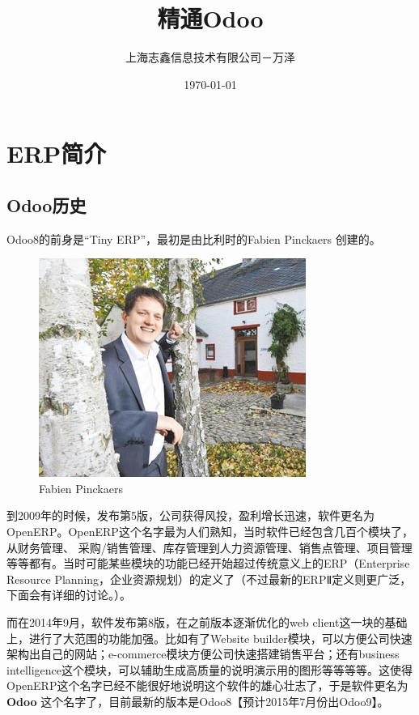 \documentclass[11pt,a4paper]{sphinxmanual}
\author{上海志鑫信息技术有限公司－万泽}
\date{\today}
\title{精通Odoo}
\begin{document}
\maketitle
\tableofcontents



\chapter{ERP简介}
\label{sec-1}
\section{Odoo历史}
\label{sec-1-1}
Odoo8的前身是“Tiny ERP”，最初是由比利时的Fabien Pinckaers 创建的。

\begin{figure}[H]
\centering
\includegraphics[keepaspectratio,max width=0.95\linewidth]{images/Fabien-Pinckaers.png}
\caption{Fabien Pinckaers}
\end{figure}

到2009年的时候，发布第5版，公司获得风投，盈利增长迅速，软件更名为OpenERP。OpenERP这个名字最为人们熟知，当时软件已经包含几百个模块了，从财务管理、
采购/销售管理、库存管理到人力资源管理、销售点管理、项目管理等等都有。当时可能某些模块的功能已经开始超过传统意义上的ERP（Enterprise Resource Planning，企业资源规划）的定义了（不过最新的ERPⅡ定义则更广泛，下面会有详细的讨论。）。

而在2014年9月，软件发布第8版，在之前版本逐渐优化的web client这一块的基础上，进行了大范围的功能加强。比如有了Website builder模块，可以方便公司快速架构出自己的网站；e-commerce模块方便公司快速搭建销售平台；还有business intelligence这个模块，可以辅助生成高质量的说明演示用的图形等等等等。这使得OpenERP这个名字已经不能很好地说明这个软件的雄心壮志了，于是软件更名为 \textbf{Odoo} 这个名字了，目前最新的版本是Odoo8【预计2015年7月份出Odoo9】。
\end{document}
